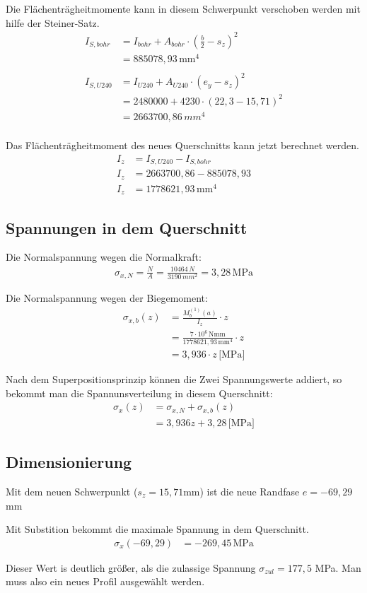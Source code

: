 Die Flächenträgheitmomente kann in diesem Schwerpunkt verschoben werden mit hilfe der Steiner-Satz.
\begin{align*}
  I_{S,bohr} &= I_{bohr} + A_{bohr} \cdot (\frac{b}{2} - s_z)^2 \\
  &= 885078{,}93 \, \text{mm}^4\\
  \\
  I_{S,U240} &= I_{U240} + A_{U240} \cdot (e_y - s_z)^2 \\
  &= 2480000 + 4230 \cdot (22{,}3 - 15{,}71)^2 \\
  &= 2663700{,}86 \, mm^4 \\
\end{align*}

Das Flächenträgheitmoment des neues Querschnitts kann jetzt berechnet werden.
\begin{align*}
  I_{z} &= I_{S,U240} - I_{S,bohr} \\
  I_{z} &= 2663700{,}86 - 885078{,}93 \\
  I_{z} &= 1778621{,}93 \, \text{mm}^4
\end{align*}

\subsection{Spannungen in dem Querschnitt}
Die Normalspannung wegen die Normalkraft:
\begin{align*}
  \sigma_{x,N} = \frac{N}{A} = \frac{10464 \, N}{3190 \, mm^2} = 3,28 \, \text{MPa}
\end{align*}

Die Normalspannung wegen der Biegemoment:
\begin{align*}
  \sigma_{x,b}(z) &= \frac{M_{b}^{(1)}(a)}{I_{z}} \cdot z \\
  &= \frac{7 \cdot 10^6 \, \text{Nmm}}{1778621{,}93 \, \text{mm}^4} \cdot z \\
  &= 3{,}936 \cdot z \, \text{[MPa]}
\end{align*}

Nach dem Superpositionsprinzip können die Zwei Spannungswerte addiert, so bekommt man die Spannunsverteilung in diesem Querschnitt:
\begin{align*}
  \sigma_{x}(z) &= \sigma_{x,N} + \sigma_{x,b}(z) \\
  &= 3{,}936z + 3,28 \, \text{[MPa]}
\end{align*}

\subsection{Dimensionierung}
Mit dem neuen Schwerpunkt ($s_z = 15,71$mm) ist die neue Randfase $e = -69,29$mm

Mit Substition bekommt die maximale Spannung in dem Querschnitt.
\begin{align*}
  \sigma_{x}(-69,29) &= -269,45 \, \text{MPa}
\end{align*}

Dieser Wert is deutlich größer, als die zulassige Spannung $\sigma_{zul} = 177,5$ MPa. Man muss also ein neues Profil ausgewählt werden.
